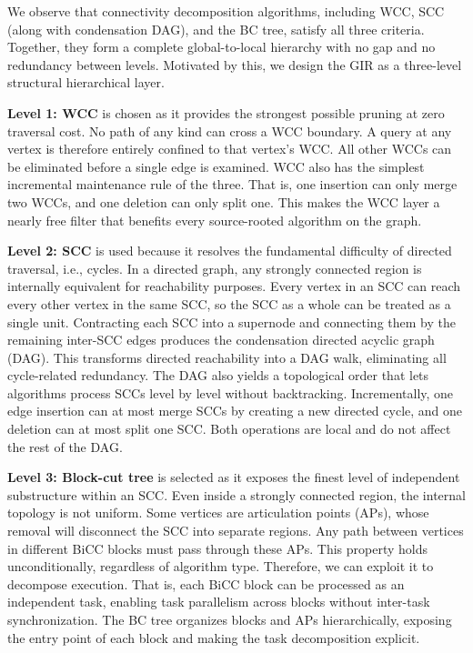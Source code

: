 We observe that connectivity decomposition algorithms, including WCC, SCC (along with condensation DAG), and the BC tree, 
satisfy all three criteria.
Together, they form a complete global-to-local hierarchy with no
gap and no redundancy between levels.
Motivated by this, we design the GIR as a three-level structural hierarchical layer.

\textbf{Level 1: WCC}
is chosen as it provides the strongest possible pruning
at zero traversal cost.
No path of any kind can cross a WCC boundary.
A query at any vertex is therefore entirely confined to that
vertex's WCC.
All other WCCs can be eliminated before a single edge is examined.
WCC also has the simplest incremental maintenance rule of the three. That is, one insertion can only merge two WCCs, and one deletion can only split one.
This makes the WCC layer a nearly free filter that benefits every
source-rooted algorithm on the graph.

\textbf{Level 2: SCC}
is used because it resolves the fundamental difficulty of
directed traversal, i.e., cycles.
In a directed graph, any strongly connected region is internally
equivalent for reachability purposes.
Every vertex in an SCC can reach every other vertex in the same
SCC, so the SCC as a whole can be treated as a single unit.
Contracting each SCC into a supernode and connecting them by the
remaining inter-SCC edges produces the condensation directed acyclic graph (DAG).
This transforms directed reachability into a DAG walk, eliminating
all cycle-related redundancy.
The DAG also yields a topological order that lets algorithms
process SCCs level by level without backtracking.
Incrementally, one edge insertion can at most merge SCCs by creating
a new directed cycle, and one deletion can at most split one SCC.
Both operations are local and do not affect the rest of the DAG.

\textbf{Level 3: Block-cut tree}
is selected as it exposes the finest level of independent
substructure within an SCC.
Even inside a strongly connected region, the internal topology is
not uniform.
Some vertices are articulation points (APs), whose removal will disconnect
the SCC into separate regions.
Any path between vertices in different BiCC blocks must pass through these APs.
This property holds unconditionally, regardless of algorithm type.
Therefore, we can exploit it to decompose execution. That is, each BiCC block can be
processed as an independent task, enabling task parallelism
across blocks without inter-task synchronization.
The BC tree organizes blocks and APs hierarchically, exposing the entry point of each block and making the task decomposition explicit.


